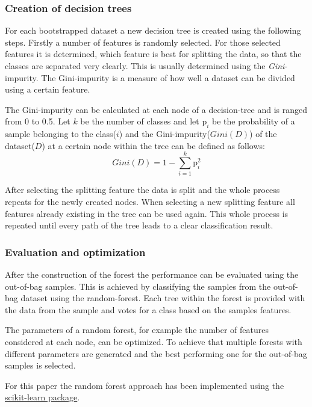 \subsubsection*{Creation of decision trees}
For each bootstrapped dataset a new decision tree is created using the following steps. Firstly a number of features is randomly selected.
For those selected features it is determined, which feature is best for splitting the data, so that the classes are separated very clearly.
This is usually determined using the \textit{Gini}-impurity.
The Gini-impurity is a measure of how well a dataset can be divided using a certain feature.

The Gini-impurity can be calculated at each node of a decision-tree and is ranged from 0 to 0.5.
Let $k$ be the number of classes and let $\mathrm{p}_{i}$ be the probability of a sample belonging to the class($i$) and the Gini-impurity($Gini(D)$) of the dataset($D$)
at a certain node within the tree can be defined as follows:
\begin{equation*}
    Gini(D) = 1 - \sum_{i=1}^{k} \mathrm{p}_{i}^2
\end{equation*} \cite[]{Karabiber}

After selecting the splitting feature the data is split and the whole process repeats for the newly created nodes.
When selecting a new splitting feature all features already existing in the tree can be used again. This whole process is 
repeated until every path of the tree leads to a clear classification result\cite[]{Breiman2001}.

\subsubsection*{Evaluation and optimization}
After the construction of the forest the performance can be evaluated using the out-of-bag samples.
This is achieved by classifying the samples from the out-of-bag dataset using the random-forest. Each tree within the forest is provided with the data from the sample
and votes for a class based on the samples features.

The parameters of a random forest, for example the number of features considered at each node, can be optimized. To achieve that multiple forests with 
different parameters are generated and the best performing one for the out-of-bag samples is selected\cite[]{Breiman2001}.

For this paper the random forest approach has been implemented using the \href{https://scikit-learn.org/stable/index.html}{scikit-learn package}. 


